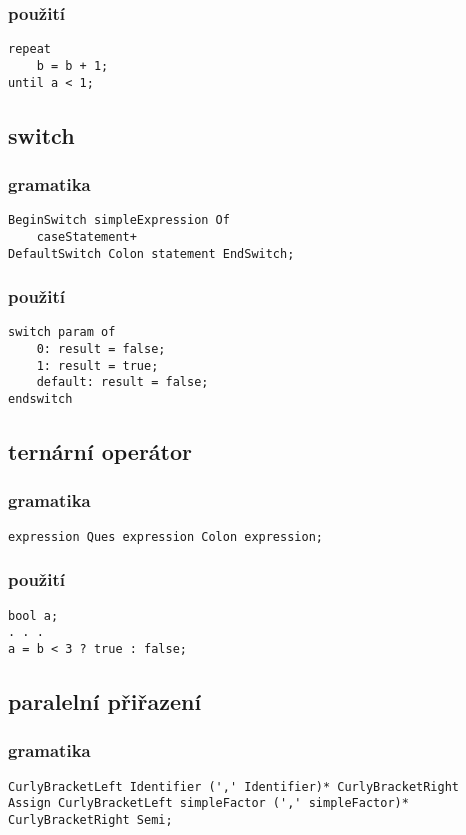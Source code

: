 \documentclass{style}
\begin{document}
\subsubsection{použití}
\begin{lstlisting}
repeat
	b = b + 1;
until a < 1;
\end{lstlisting}

\subsection{switch}
\subsubsection{gramatika}
\begin{lstlisting}
BeginSwitch simpleExpression Of 
	caseStatement+ 
DefaultSwitch Colon statement EndSwitch;
\end{lstlisting}

\subsubsection{použití}
\begin{lstlisting}
switch param of
    0: result = false;
    1: result = true;
    default: result = false;
endswitch
\end{lstlisting}

\subsection{ternární operátor}
\subsubsection{gramatika}
\begin{lstlisting}
expression Ques expression Colon expression;
\end{lstlisting}

\subsubsection{použití}
\begin{lstlisting}
bool a;
. . .
a = b < 3 ? true : false;
\end{lstlisting}

\subsection{paralelní přiřazení}
\subsubsection{gramatika}
\begin{lstlisting}
CurlyBracketLeft Identifier (',' Identifier)* CurlyBracketRight 
Assign CurlyBracketLeft simpleFactor (',' simpleFactor)* 
CurlyBracketRight Semi;
\end{lstlisting}
\end{document}
